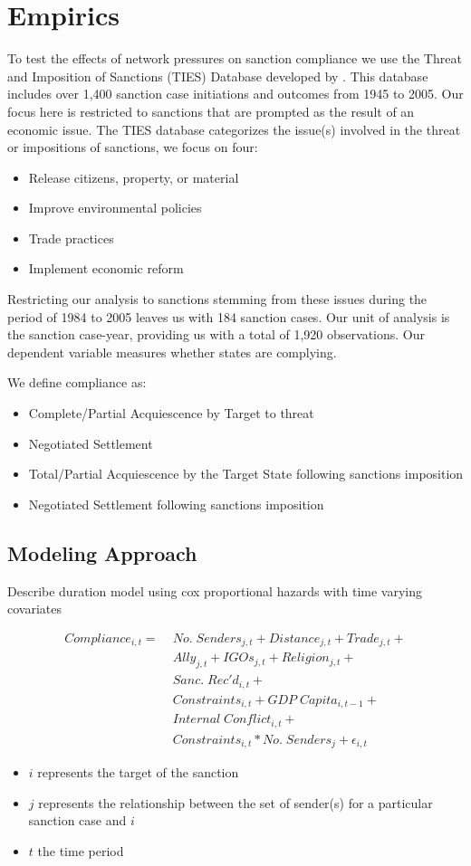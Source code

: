 \section{Empirics}
\label{empirics}

To test the effects of network pressures on sanction compliance we use the Threat and Imposition of Sanctions (TIES) Database developed by \citet{morgan2009threat}. This database includes over 1,400 sanction case initiations and outcomes from 1945 to 2005. Our focus here is restricted to sanctions that are prompted as the result of an economic issue. The TIES database categorizes the issue(s) involved in the threat or impositions of sanctions, we focus on four:

\begin{itemize}
	\item Release citizens, property, or material
	\item Improve environmental policies
	\item Trade practices
	\item Implement economic reform
\end{itemize}

Restricting our analysis to sanctions stemming from these issues during the period of 1984 to 2005 leaves us with 184 sanction cases. Our unit of analysis is the sanction case-year, providing us with a total of 1,920 observations. Our dependent variable measures whether states are complying. 


We define compliance as:
	\begin{itemize}
		\item Complete/Partial Acquiescence by Target to threat
		\item Negotiated Settlement
		\item Total/Partial Acquiescence by the Target State following sanctions imposition
		\item Negotiated Settlement following sanctions imposition
	\end{itemize}
	
\subsection{Modeling Approach} 

Describe duration model using cox proportional hazards with time varying covariates

\begin{align*}
		Compliance_{i,t} =\; & No. \; Senders_{j,t} + Distance_{j,t} + Trade_{j,t}  + \\
		 &Ally_{j,t} + IGOs_{j,t} + Religion_{j,t} +\\
 		 &Sanc. \; Rec'd_{i,t} + \\
		 &Constraints_{i,t} + GDP \; Capita_{i,t-1} +\\
		 & Internal \; Conflict_{i,t} +\\
		 &Constraints_{i,t}*No. \; Senders_{j} + \epsilon_{i,t}
	\end{align*}
	
\begin{itemize}
	\item $i$ represents the target of the sanction
	\item $j$ represents the relationship between the set of sender(s) for a particular sanction case and $i$
	\item $t$ the time period
\end{itemize}
